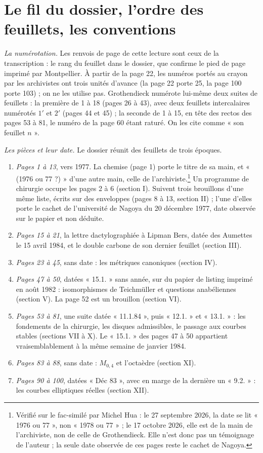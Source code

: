 \documentclass[11pt,a4paper]{article}
\begin{document}
\section*{Le fil du dossier, l'ordre des feuillets, les conventions}

\emph{La numérotation.} Les renvois de page de cette lecture sont ceux de la
transcription : le rang du feuillet dans le dossier, que confirme le pied de
page imprimé par Montpellier. À partir de la page 22, les numéros portés au
crayon par les archivistes ont trois unités d'avance (la page 22 porte 25, la
page 100 porte 103) ; on ne les utilise pas. Grothendieck numérote lui-même
deux suites de feuillets : la première de 1 à 18 (pages 26 à 43), avec deux
feuillets intercalaires numérotés $1'$ et $2'$ (pages 44 et 45) ; la seconde de
1 à 15, en tête des rectos des pages 53 à 81, le numéro de la page 60 étant
raturé. On les cite comme « son feuillet $n$ ».

\emph{Les pièces et leur date.} Le dossier réunit des feuillets de trois
époques.

\begin{enumerate}
  \item \emph{Pages 1 à 13}, vers 1977. La chemise (page 1) porte le
  titre de sa main, et « (1976 ou 77 ?) » d'une autre main, celle de
  l'archiviste.\footnote{Vérifié sur le fac-similé par Michel Hua : le
  27 septembre 2026, la date se lit « 1976 ou 77 », non « 1978 ou 77 » ; le
  17 octobre 2026, elle est de la main de l'archiviste, non de celle de
  Grothendieck. Elle n'est donc pas un témoignage de l'auteur ; la seule date
  observée de ces pages reste le cachet de Nagoya.} Un programme de chirurgie occupe les
  pages 2 à 6 (section I). Suivent trois brouillons d'une même liste, écrits
  sur des enveloppes (pages 8 à 13, section II) ; l'une d'elles porte le
  cachet de l'université de Nagoya du 20 décembre 1977, date observée sur le
  papier et non déduite.
  \item \emph{Pages 15 à 21}, la lettre dactylographiée à Lipman Bers, datée
  des Aumettes le 15 avril 1984, et le double carbone de son dernier feuillet
  (section III).
  \item \emph{Pages 23 à 45}, sans date : les métriques canoniques
  (section IV).
  \item \emph{Pages 47 à 50}, datées « 15.1. » sans année, sur du papier de
  listing imprimé en août 1982 : isomorphismes de Teichmüller et questions
  anabéliennes (section V). La page 52 est un brouillon (section VI).
  \item \emph{Pages 53 à 81}, une suite datée « 11.1.84 », puis « 12.1. » et
  « 13.1. » : les fondements de la chirurgie, les disques admissibles, le
  passage aux courbes stables (sections VII à X). Le « 15.1. » des pages 47
  à 50 appartient vraisemblablement à la même semaine de janvier 1984.
  \item \emph{Pages 83 à 88}, sans date : $M_{0,4}$ et l'octaèdre
  (section XI).
  \item \emph{Pages 90 à 100}, datées « Déc 83 », avec en marge de la
  dernière un « 9.2. » : les courbes elliptiques réelles (section XII).
\end{enumerate}
\end{document}
